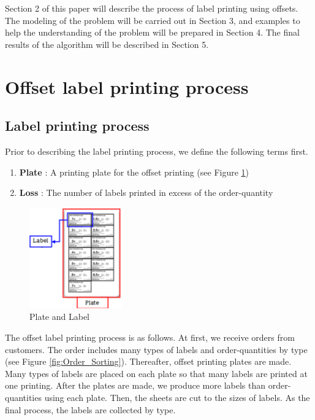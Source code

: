 \documentclass[review]{elsarticle}
\begin{document}
Section 2 of this paper will describe the process of label printing using offsets. The modeling of the problem will be carried out in Section 3, and examples to help the understanding of the problem will be prepared in Section 4. The final results of the algorithm will be described in Section 5. 


\section{Offset label printing process}\label{sec:Offset}

\subsection{Label printing process}\label{subsec:LabelPrinting}
Prior to describing the label printing process, we define the following terms first.
\begin{enumerate}[*]
	\item {\bf Plate} : A printing plate for the offset printing (see Figure \ref{fig:PlateLabel})
	\item {\bf Loss} : The number of labels printed in excess of the order-quantity
\end{enumerate}

\begin{figure}
	\includegraphics[width=4cm]{PlateLabel.pdf}
	\caption{Plate and Label}
	\label{fig:PlateLabel}       %
\end{figure}

The offset label printing process is as follows. At first, we receive orders from customers. The order includes many types of labels and order-quantities by type (see Figure \ref{fig:Order_Sorting}). Thereafter, offset printing plates are made. Many types of labels are placed on each plate so that many labels are printed at one printing. After the plates are made, we produce more labels than order-quantities using each plate. Then, the sheets are cut to the sizes of labels. As the final process, the labels are collected by type.
\end{document}
